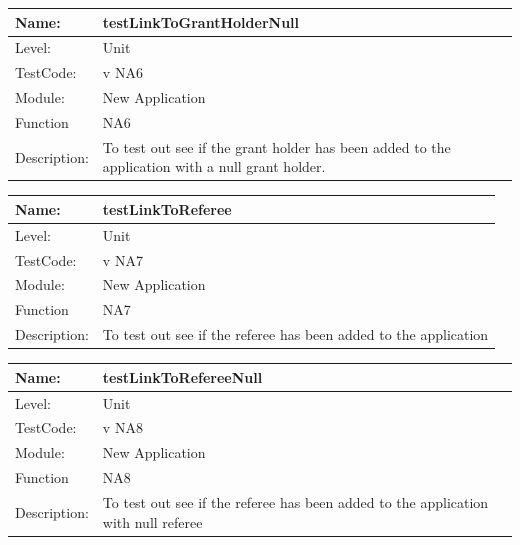\documentclass[12pt]{article}
\begin{document}
\begin{flushleft}
\begin{center}
\begin{tabular}{|l|p{12cm}|}
\hline

 Name: & testLinkToGrantHolderNull  \\
\hline
Level: & Unit \\
\hline
TestCode: & v NA6 \\
\hline
Module:& New Application\\
\hline
Function & NA6 \\
\hline
Description: & To test out see if the grant holder has been added to the application with a null grant holder.  \\
\hline

\end{tabular}
\end{center}

\begin{center}
\begin{tabular}{|l|p{12cm}|}
\hline

 Name: & testLinkToReferee  \\
\hline
Level: & Unit \\
\hline
TestCode: & v NA7 \\
\hline
Module:& New Application\\
\hline
Function & NA7 \\
\hline
Description: & To test out see if the referee has been added to the application  \\
\hline

\end{tabular}
\end{center}

\begin{center}
\begin{tabular}{|l|p{12cm}|}
\hline

 Name: & testLinkToRefereeNull  \\
\hline
Level: & Unit \\
\hline
TestCode: & v NA8 \\
\hline
Module:& New Application\\
\hline
Function & NA8 \\
\hline
Description: & To test out see if the referee has been added to the application with null referee  \\
\hline

\end{tabular}
\end{center}


\end{flushleft}
\end{document}
